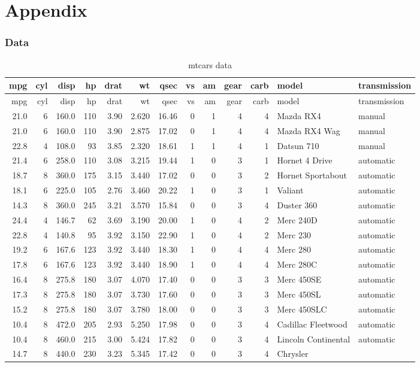 \documentclass[]{article}
\begin{document}
\hypertarget{appendix}{%
\section{Appendix}\label{appendix}}

\hypertarget{data}{%
\subsubsection{Data}\label{data}}

\begin{longtable}[]{@{}rrrrrrrrrrrll@{}}
\caption{mtcars data}\tabularnewline
\toprule
mpg & cyl & disp & hp & drat & wt & qsec & vs & am & gear & carb & model
& transmission\tabularnewline
\midrule
\endfirsthead
\toprule
mpg & cyl & disp & hp & drat & wt & qsec & vs & am & gear & carb & model
& transmission\tabularnewline
\midrule
\endhead
21.0 & 6 & 160.0 & 110 & 3.90 & 2.620 & 16.46 & 0 & 1 & 4 & 4 & Mazda
RX4 & manual\tabularnewline
21.0 & 6 & 160.0 & 110 & 3.90 & 2.875 & 17.02 & 0 & 1 & 4 & 4 & Mazda
RX4 Wag & manual\tabularnewline
22.8 & 4 & 108.0 & 93 & 3.85 & 2.320 & 18.61 & 1 & 1 & 4 & 1 & Datsun
710 & manual\tabularnewline
21.4 & 6 & 258.0 & 110 & 3.08 & 3.215 & 19.44 & 1 & 0 & 3 & 1 & Hornet 4
Drive & automatic\tabularnewline
18.7 & 8 & 360.0 & 175 & 3.15 & 3.440 & 17.02 & 0 & 0 & 3 & 2 & Hornet
Sportabout & automatic\tabularnewline
18.1 & 6 & 225.0 & 105 & 2.76 & 3.460 & 20.22 & 1 & 0 & 3 & 1 & Valiant
& automatic\tabularnewline
14.3 & 8 & 360.0 & 245 & 3.21 & 3.570 & 15.84 & 0 & 0 & 3 & 4 & Duster
360 & automatic\tabularnewline
24.4 & 4 & 146.7 & 62 & 3.69 & 3.190 & 20.00 & 1 & 0 & 4 & 2 & Merc 240D
& automatic\tabularnewline
22.8 & 4 & 140.8 & 95 & 3.92 & 3.150 & 22.90 & 1 & 0 & 4 & 2 & Merc 230
& automatic\tabularnewline
19.2 & 6 & 167.6 & 123 & 3.92 & 3.440 & 18.30 & 1 & 0 & 4 & 4 & Merc 280
& automatic\tabularnewline
17.8 & 6 & 167.6 & 123 & 3.92 & 3.440 & 18.90 & 1 & 0 & 4 & 4 & Merc
280C & automatic\tabularnewline
16.4 & 8 & 275.8 & 180 & 3.07 & 4.070 & 17.40 & 0 & 0 & 3 & 3 & Merc
450SE & automatic\tabularnewline
17.3 & 8 & 275.8 & 180 & 3.07 & 3.730 & 17.60 & 0 & 0 & 3 & 3 & Merc
450SL & automatic\tabularnewline
15.2 & 8 & 275.8 & 180 & 3.07 & 3.780 & 18.00 & 0 & 0 & 3 & 3 & Merc
450SLC & automatic\tabularnewline
10.4 & 8 & 472.0 & 205 & 2.93 & 5.250 & 17.98 & 0 & 0 & 3 & 4 & Cadillac
Fleetwood & automatic\tabularnewline
10.4 & 8 & 460.0 & 215 & 3.00 & 5.424 & 17.82 & 0 & 0 & 3 & 4 & Lincoln
Continental & automatic\tabularnewline
14.7 & 8 & 440.0 & 230 & 3.23 & 5.345 & 17.42 & 0 & 0 & 3 & 4 & Chrysler

\end{longtable}
\end{document}
